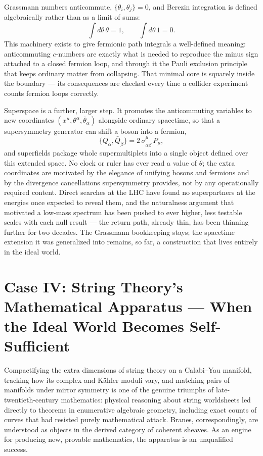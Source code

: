 \documentclass[11pt]{book}
\begin{document}
Grassmann numbers anticommute, $\{\theta_i,\theta_j\}=0$, and Berezin integration is defined algebraically rather than as a limit of sums:
\[
\int d\theta\,\theta = 1, \qquad \int d\theta\, 1 = 0 .
\]
This machinery exists to give fermionic path integrals a well-defined meaning: anticommuting $c$-numbers are exactly what is needed to reproduce the minus sign attached to a closed fermion loop, and through it the Pauli exclusion principle that keeps ordinary matter from collapsing. That minimal core is squarely inside the boundary --- its consequences are checked every time a collider experiment counts fermion loops correctly.

Superspace is a further, larger step. It promotes the anticommuting variables to new coordinates $(x^\mu,\theta^\alpha,\bar\theta_{\dot\alpha})$ alongside ordinary spacetime, so that a supersymmetry generator can shift a boson into a fermion,
\[
\{Q_\alpha, \bar Q_{\dot\beta}\} = 2\,\sigma^\mu_{\alpha\dot\beta}\,P_\mu ,
\]
and superfields package whole supermultiplets into a single object defined over this extended space. No clock or ruler has ever read a value of $\theta$; the extra coordinates are motivated by the elegance of unifying bosons and fermions and by the divergence cancellations supersymmetry provides, not by any operationally required content. Direct searches at the LHC have found no superpartners at the energies once expected to reveal them, and the naturalness argument that motivated a low-mass spectrum has been pushed to ever higher, less testable scales with each null result --- the return path, already thin, has been thinning further for two decades. The Grassmann bookkeeping stays; the spacetime extension it was generalized into remains, so far, a construction that lives entirely in the ideal world.

\section{Case IV: String Theory's Mathematical Apparatus --- When the Ideal World Becomes Self-Sufficient}

Compactifying the extra dimensions of string theory on a Calabi--Yau manifold, tracking how its complex and K\"ahler moduli vary, and matching pairs of manifolds under mirror symmetry is one of the genuine triumphs of late-twentieth-century mathematics: physical reasoning about string worldsheets led directly to theorems in enumerative algebraic geometry, including exact counts of curves that had resisted purely mathematical attack. Branes, correspondingly, are understood as objects in the derived category of coherent sheaves. As an engine for producing new, provable mathematics, the apparatus is an unqualified success.
\end{document}
